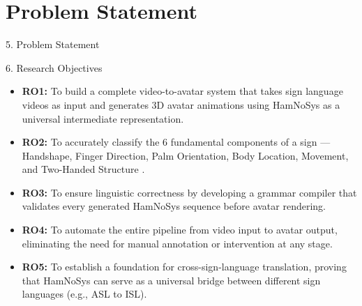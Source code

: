 \documentclass[aspectratio=169]{beamer}
\begin{document}
\section{Problem Statement}
\begin{frame}{5. Problem Statement}
\vspace{0.3cm}
\centering
{}
\end{frame}

\begin{frame}{6. Research Objectives}
\footnotesize
\begin{itemize}
\setlength{\itemsep}{0.16cm}
\item \textbf{RO1:} To build a complete video-to-avatar system that takes sign language videos as input and generates 3D avatar animations using HamNoSys as a universal intermediate representation.
\item \textbf{RO2:} To accurately classify the 6 fundamental components of a sign --- Handshape, Finger Direction, Palm Orientation, Body Location, Movement, and Two-Handed Structure .
\item \textbf{RO3:} To ensure linguistic correctness by developing a grammar compiler that validates every generated HamNoSys sequence before avatar rendering.
\item \textbf{RO4:} To automate the entire pipeline from video input to avatar output, eliminating the need for manual annotation or intervention at any stage.
\item \textbf{RO5:} To establish a foundation for cross-sign-language translation, proving that HamNoSys can serve as a universal bridge between different sign languages (e.g., ASL to ISL).
\end{itemize}
\end{frame}
\end{document}
